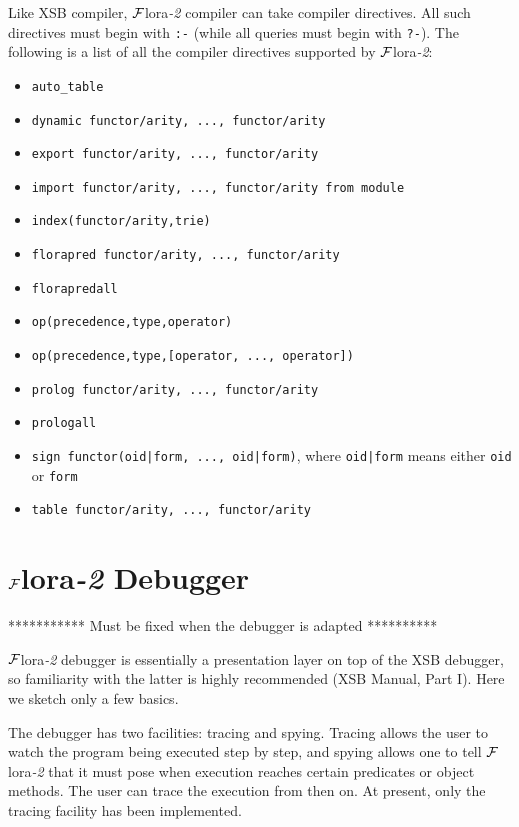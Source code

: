 \documentclass[11pt]{article}
\newcommand{\FLORA}{{\mbox{${\cal F}${\sc lora}\rm\emph{-2}}}\xspace}
\begin{document}
%
%
Like XSB compiler, \FLORA compiler can take compiler directives. All
such directives must begin with {\tt :-} (while all queries must begin with
{\tt ?-}). The following is a list of all the compiler directives supported
by \FLORA:
\begin{itemize}
\item \verb!auto_table!
\item \verb!dynamic functor/arity, ..., functor/arity!
\item \verb!export functor/arity, ..., functor/arity!
\item \verb!import functor/arity, ..., functor/arity from module!
\item \verb!index(functor/arity,trie)!
\item \verb!florapred functor/arity, ..., functor/arity!
\item \verb!florapredall!
\item \verb!op(precedence,type,operator)!
\item \verb!op(precedence,type,[operator, ..., operator])!
\item \verb!prolog functor/arity, ..., functor/arity!
\item \verb!prologall!
\item \verb!sign functor(oid|form, ..., oid|form)!, where \verb!oid|form! means
      either \verb|oid| or \verb!form!
\item \verb!table functor/arity, ..., functor/arity!
\end{itemize}


\section{\FLORA Debugger}


*********** Must be fixed when the debugger is adapted **********


\FLORA debugger is essentially a presentation layer on top of the XSB
debugger, so familiarity with the latter is highly recommended (XSB Manual,
Part I). Here we sketch only a few basics.

The debugger has two facilities: tracing and spying. Tracing allows the
user to watch the program being executed step by step, and spying allows
one to tell \FLORA that it must pose when execution reaches certain 
predicates or object methods. The user can trace the execution from then
on. At present, only the tracing facility has been implemented.
\end{document}
